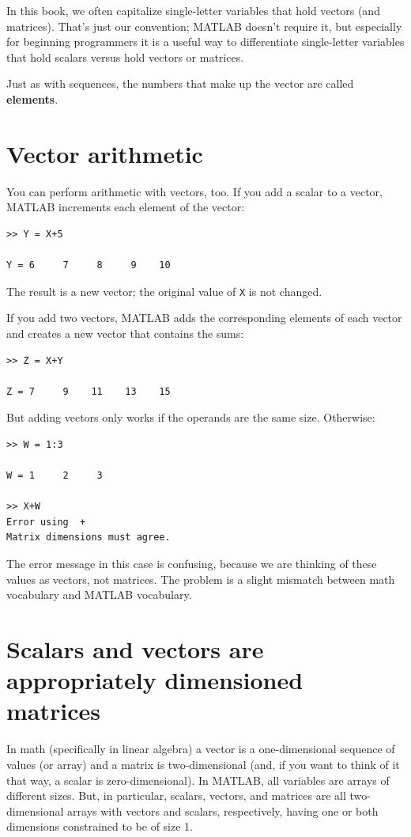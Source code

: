 \documentclass[
]{book}
\begin{document}
In this book, we often capitalize single-letter variables that hold vectors 
(and matrices).
That's
just our convention; MATLAB doesn't require it, but especially for beginning
programmers it is a useful way to 
differentiate single-letter variables that hold scalars versus hold vectors or matrices.

Just as with sequences, the numbers that make up the vector are called
{\bf elements}.


\section{Vector arithmetic}

You can perform arithmetic with vectors, too.  If you add a scalar
to a vector, MATLAB increments each element of the vector:

\begin{verbatim}
>> Y = X+5

Y = 6     7     8     9    10
\end{verbatim}

The result is a new vector; the original value of {\tt X} is not
changed.

If you add two vectors, MATLAB adds the corresponding elements of each
vector and creates a new vector that contains the sums:

\begin{verbatim}
>> Z = X+Y

Z = 7     9    11    13    15
\end{verbatim}

But adding vectors only works if the operands are the same size.
Otherwise:

\begin{verbatim}
>> W = 1:3

W = 1     2     3

>> X+W
Error using  +
Matrix dimensions must agree.
\end{verbatim}

The error message in this case is confusing, because we are thinking
of these values as vectors, not matrices.  The problem is a slight
mismatch between math vocabulary and MATLAB vocabulary.


\section{Scalars and vectors are appropriately dimensioned matrices}

In math (specifically in linear algebra) a vector is a one-dimensional
sequence of values (or array) and a matrix is two-dimensional (and, if you want
to think of it that way, a scalar is zero-dimensional).  In MATLAB,
all variables are arrays of different sizes.  But, in particular, 
scalars, vectors, and matrices are all two-dimensional arrays with 
vectors and scalars, respectively, having one or both dimensions 
constrained to be of size 1.
\end{document}
